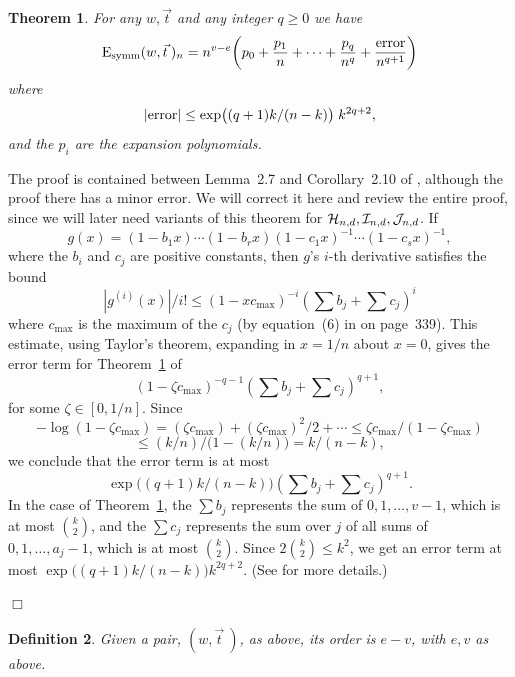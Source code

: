 \documentclass[12pt]{article}
\newtheorem{theorem}{Theorem}[section]
\newtheorem{definition}[theorem]{Definition}
\newcommand{\ch}{{\cal H}}
\newcommand{\ci}{{\cal I}}
\newcommand{\cj}{{\cal J}}
\newcommand{\cjnd}{\cj_{n,d}}
\newcommand{\cind}{\ci_{n,d}}
\newcommand{\chnd}{\ch_{n,d}}
\newcommand{\Esymm}{{\rm E}_{\rm symm}}
\newcommand{\proofbox}{\begin{flushright}$\Box$\end{flushright}}
\begin{document}
\begin{theorem}\label{th:exp_polys}
For any $w,\vec t$ and any integer $q\ge 0$ we have
\begin{equation}\label{eq:simple_expansion}
\Esymm(w,\vec t\>)_n = n^{v-e} \biggl( p_0+\frac{p_1}{n}+\cdots+\frac{p_q}{n^q}
+ \frac{{\rm error}}{n^{q+1}} \biggr)
\end{equation}
where
$$
|{\rm error}| \le \exp\bigl((q+1)k/(n-k)\bigr)\; k^{2q+2},
$$
and the $p_i$ are the expansion polynomials.
\end{theorem}
The proof is contained between
Lemma~2.7 and Corollary~2.10 of \cite{friedman_random_graphs}, although
the proof there has a minor error.  We will correct it here and review 
the entire proof,
since we will later 
need variants of this theorem for $\chnd,\cind,\cjnd$.
If
\begin{equation}\label{eq:g_rational}
g(x)=(1-b_1x)\cdots(1-b_rx)(1-c_1x)^{-1}\cdots(1-c_sx)^{-1},
\end{equation}
where the $b_i$ and $c_j$ are positive constants,
then $g$'s $i$-th derivative satisfies the bound
$$
|g^{(i)}(x)|/i!\le (1-xc_{\max})^{-i}\left(\sum b_j+\sum c_j\right)^i
$$
where $c_{\max}$ is the maximum of the $c_j$
(by equation~(6) in \cite{friedman_random_graphs} on page~339).
This estimate, using Taylor's theorem, expanding in $x=1/n$ about $x=0$,
gives the error term for Theorem~\ref{th:exp_polys} of
$$
(1-\zeta c_{\max})^{-q-1} \left(\sum b_j+\sum c_j\right)^{q+1},
$$
for some $\zeta\in[0,1/n]$.
Since
$$
-\log(1-\zeta c_{\max})=(\zeta c_{\max})+(\zeta c_{\max})^2/2+\cdots
\le \zeta c_{\max}/(1-\zeta c_{\max})
$$
$$
\le (k/n)/\bigl(1-(k/n)\bigr) = k/(n-k),
$$
we conclude that the error term is at most
\begin{equation}\label{eq:error_term}
\exp\bigl( (q+1)k/(n-k) \bigr) \left(\sum b_j+\sum c_j\right)^{q+1}.
\end{equation}
In the case of Theorem~\ref{th:exp_polys}, the $\sum b_j$ represents
the sum of $0,1,\ldots,v-1$, which is at most $\binom{k}{2}$, and
the $\sum c_j$ represents the sum over $j$ of all sums of $0,1,\ldots,a_j-1$,
which is at most $\binom{k}{2}$.  Since $2\binom{k}{2}\le k^2$, we
get an error term at most $\exp\bigl((q+1)k/(n-k)\bigr)k^{2q+2}$.
(See \cite{friedman_random_graphs} for more details.)
\proofbox

\begin{definition} Given a pair, $(w,\vec t\>)$, as above, its {\em order}
is $e-v$, with $e,v$ as above.
\end{definition}
\end{document}
